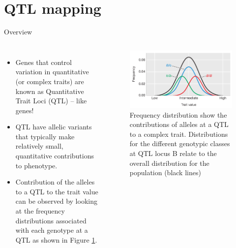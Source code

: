 \documentclass[
  ignorenonframetext,
  aspectratio=169]{beamer}
\begin{document}
\hypertarget{qtl-mapping}{%
\section{QTL mapping}\label{qtl-mapping}}

\begin{frame}{Overview}
\protect\hypertarget{overview}{}
\begin{columns}[T,onlytextwidth]
  \footnotesize
  \begin{itemize}
  \item Genes that control variation in quantitative (or complex traits) are known as Quantitative Trait Loci (QTL) -- like genes!
  \item QTL have allelic variants that typically make relatively small, quantitative contributions to phenotype.
  \item Contribution of the alleles to a QTL to the trait value can be observed by looking at the frequency distributions associated with each genotype at a QTL as shown in Figure \ref{fig:allele-freq-distribution}.
  \end{itemize}
  
\begin{figure}
\includegraphics[width=0.9\linewidth]{../images/frequency_distribution_showing_contribution_qtl} \caption{Frequency distribution show the contributions of alleles at a QTL to a complex trait. Distributions for the different genotypic classes at QTL locus B relate to the overall distribution for the population (black lines)}\label{fig:allele-freq-distribution}
\end{figure}

\end{columns}
\end{frame}
\end{document}
